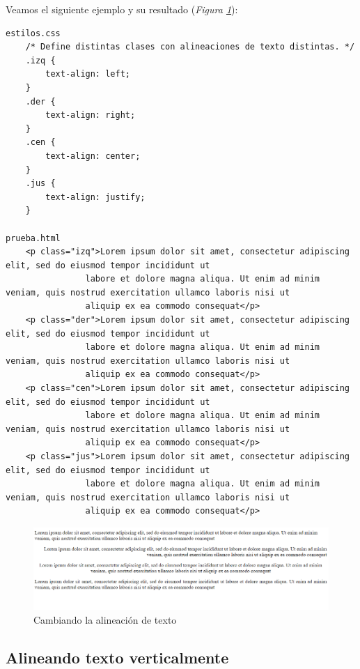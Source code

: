 Veamos el siguiente ejemplo y su resultado (\textit{Figura \ref{fig: 8}}):
\begin{lstlisting}
estilos.css
    /* Define distintas clases con alineaciones de texto distintas. */
    .izq {
        text-align: left;
    }
    .der {
        text-align: right;
    }
    .cen {
        text-align: center;
    }
    .jus {
        text-align: justify;
    }

prueba.html
    <p class="izq">Lorem ipsum dolor sit amet, consectetur adipiscing elit, sed do eiusmod tempor incididunt ut
                labore et dolore magna aliqua. Ut enim ad minim veniam, quis nostrud exercitation ullamco laboris nisi ut
                aliquip ex ea commodo consequat</p>
    <p class="der">Lorem ipsum dolor sit amet, consectetur adipiscing elit, sed do eiusmod tempor incididunt ut
                labore et dolore magna aliqua. Ut enim ad minim veniam, quis nostrud exercitation ullamco laboris nisi ut
                aliquip ex ea commodo consequat</p>
    <p class="cen">Lorem ipsum dolor sit amet, consectetur adipiscing elit, sed do eiusmod tempor incididunt ut
                labore et dolore magna aliqua. Ut enim ad minim veniam, quis nostrud exercitation ullamco laboris nisi ut
                aliquip ex ea commodo consequat</p>
    <p class="jus">Lorem ipsum dolor sit amet, consectetur adipiscing elit, sed do eiusmod tempor incididunt ut
                labore et dolore magna aliqua. Ut enim ad minim veniam, quis nostrud exercitation ullamco laboris nisi ut
                aliquip ex ea commodo consequat</p>
\end{lstlisting}
\begin{figure}[H]
    \centering
    \caption{Cambiando la alineación de texto}
    \label{fig: 8}
    \includegraphics[width=14cm]{ss/fuentes-align.png}
\end{figure}


\subsection{Alineando texto verticalmente}

